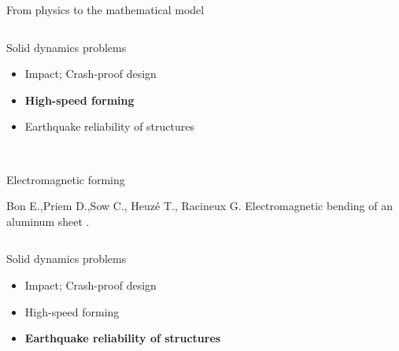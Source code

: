 \begin{frame}{From physics to the mathematical model}
\begin{overprint}
    \begin{columns}
      \begin{column}{0.45\textwidth}
        \begin{block}{Solid dynamics problems}
          \begin{itemize}
          \item[] Impact; Crash-proof design
          \item[] \textbf{High-speed forming}
          \item[] Earthquake reliability of structures 
          \end{itemize}
        \end{block}
      \end{column}
      
      \begin{column}{0.55\textwidth}
      \end{column}
    \end{columns}

    \centering
    \\
    \scriptsize Electromagnetic forming \cite{Formage}
    \vfill
    {\tiny
      \usebibitemtemplate{\color{structure}\insertbiblabel} 
      \usebibliographyblocktemplate{\color{structure}}{\color{black}}{\color{structure!75}}{\color{structure!75}} 
      \begin{thebibliography}{EMF}
        \tiny {}
        Bon E.,Priem D.,Sow C., Heuzé T., Racineux G.
        \newblock Electromagnetic bending of an aluminum sheet
        .
      \end{thebibliography}}  

    \begin{columns}
      \begin{column}{0.45\textwidth}
        \begin{block}{Solid dynamics problems}
          \begin{itemize}
          \item[] Impact; Crash-proof design
          \item[] High-speed forming
          \item[] \textbf{Earthquake reliability of structures}
          \end{itemize}
        \end{block}
      \end{column}
      

\end{columns}
\end{overprint}
\end{frame}
